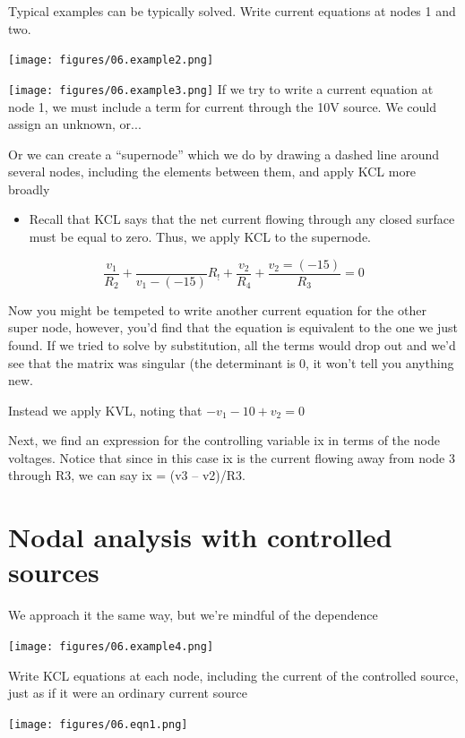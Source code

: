 \documentclass[11pt]{book}
\begin{document}
Typical examples can be typically solved. Write current equations at nodes 1 and two.

\texttt{[image: figures/06.example2.png]}

\texttt{[image: figures/06.example3.png]}
If we try to write a current equation at node 1, we must include a term for current through the 10V source. We could assign an unknown, or...

Or we can create a ``supernode'' which we do by drawing a dashed line around several nodes, including the elements between them, and apply KCL more broadly

\begin{itemize}
	\item Recall that KCL says that the net current flowing through any closed surface must be equal to zero. Thus, we apply KCL to the supernode.
\end{itemize}
\begin{equation}
	\frac{v_1}{R_2} + \frac{}{v_1 - (-15)}{R_!} + \frac{v_2}{R_4} + \frac{v_2 = (-15)}{R_3} = 0
\end{equation}

Now you might be tempeted to write another current equation for the other super node, however, you’d find that the equation is equivalent to the one we just found. If we tried to solve by substitution, all the terms would drop out and we’d see that the matrix was singular (the determinant is 0, it won't tell you anything new. 

Instead we apply KVL, noting that $-v_1 - 10 + v_2 = 0$

Next, we find an expression for the controlling variable ix in terms of the node voltages. Notice that since in this case ix is the current flowing away from node 3 through R3, we can say ix = (v3 – v2)/R3.


\newpage

\section{Nodal analysis with controlled sources}
We approach it the same way, but we're mindful of the dependence
\begin{center}
	\texttt{[image: figures/06.example4.png]}
\end{center}


Write KCL equations at each node, including the current of the controlled source, just as if it were an ordinary current source

\begin{center}
	\texttt{[image: figures/06.eqn1.png]}
\end{center}
\end{document}
